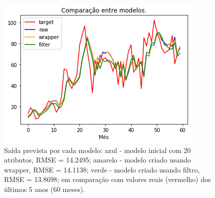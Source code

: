 \documentclass[a4paper, 12pt]{article}
\begin{document}
\begin{figure}[h!]
    \centering
  \includegraphics[width=10cm]{images/comparison.png}
    \caption{Saída prevista por cada modelo: azul - modelo inicial com 20 atributos, RMSE = 14.2495; amarelo - modelo criado usando wrapper, RMSE = 14.1138; verde - modelo criado usando filtro, RMSE = 13.8698;  em comparação com valores reais (vermelho) dos últimos 5 anos (60 meses).}
\end{figure}
\end{document}

